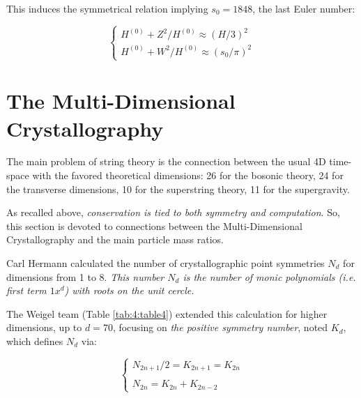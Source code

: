 \documentclass[a4paper,9pt]{article}
\begin{document}
This induces the symmetrical relation implying $s_0 = 1848$, the last Euler number:

\begin{equation}\label{Eq21}
 \left\{
    \begin{array}{ll}
        H^{(0)} + Z^2/H^{(0)} \approx (H/3)^2\\
        H^{(0)} + W^2/H^{(0)} \approx (s_0/\pi)^2
    \end{array}
\right.
\end{equation}




\section{The Multi-Dimensional Crystallography}

The main problem of string theory is the connection between the usual 4D time-space with the favored theoretical dimensions: 26 for the bosonic theory, 24 for the transverse dimensions, 10 for the superstring theory, 11 for the supergravity. 

As recalled above, \textit{conservation is tied to both symmetry and computation}. So, this section is devoted to connections between the Multi-Dimensional Crystallography and the main particle mass ratios.

Carl Hermann \cite {Hermann} calculated the number of crystallographic point symmetries $N_d$ for dimensions from 1 to 8. \textit{This number $N_d$ is the number of monic polynomials (i.e. first term $1x^d$) with roots on the unit cercle.}


The Weigel team\cite{Weigel} (Table \ref{tab:4:table4}) extended this calculation for higher dimensions, up to $d=70$, focusing on \textit{the positive symmetry number}, noted $K_{d}$, which defines $N_d$ via: 

\begin{equation}\label{Eq22}
 \left\{
    \begin{array}{ll}
            N_{2n+1}/2 =  K_{2n+1} =  K_{2n} \\
            \\
          N_{2n} = K_{2n} + K_{2n-2}
    \end{array}
\right.
\end{equation}
\end{document}
